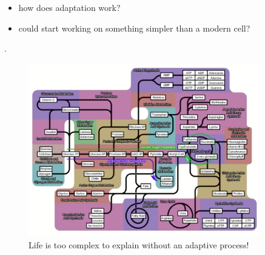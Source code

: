 \documentclass[]{article}
\begin{document}
\begin{itemize}
	\item  how does adaptation work?
	\item could start working on something simpler than a modern cell?
\end{itemize}.

\begin{figure}[H]
	\caption{Life is too complex to explain without an adaptive
		process!}\label{fig:LifeTooComplex}
	\includegraphics[width=0.9\textwidth]{LifeTooComplex}
\end{figure}
\end{document}
